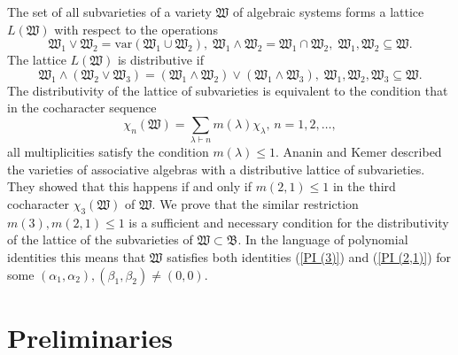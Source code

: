 \documentclass{amsart}
\theoremstyle{definition}
\begin{document}
The set of all subvarieties of a variety $\mathfrak W$ of algebraic systems forms a lattice $L({\mathfrak W})$ with respect to the operations
\[
{\mathfrak W}_1\vee{\mathfrak W}_2=\text{var}({\mathfrak W}_1\cup{\mathfrak W}_2),\;{\mathfrak W}_1\wedge{\mathfrak W}_2={\mathfrak W}_1\cap{\mathfrak W}_2,\;
{\mathfrak W}_1,{\mathfrak W}_2\subseteq {\mathfrak W}.
\]
The lattice $L({\mathfrak W})$ is distributive if
\[
{\mathfrak W}_1\wedge({\mathfrak W}_2\vee{\mathfrak W}_3)=({\mathfrak W}_1\wedge{\mathfrak W}_2)\vee({\mathfrak W}_1\wedge{\mathfrak W}_3),\;
{\mathfrak W}_1,{\mathfrak W}_2,{\mathfrak W}_3\subseteq{\mathfrak W}.
\]
The distributivity of the lattice of subvarieties is equivalent to the condition that in the cocharacter sequence
\[
\chi_n({\mathfrak W})=\sum_{\lambda\vdash n}m(\lambda)\chi_{\lambda},\,n=1,2,\ldots,
\]
all  multiplicities satisfy the condition $m(\lambda)\leq 1$.
Ananin and Kemer \cite{AK} described the varieties of associative algebras with a distributive lattice of subvarieties.
They showed that this happens if and only if  $m(2,1)\leq 1$ in the third cocharacter $\chi_3({\mathfrak W})$ of $\mathfrak W$.
We prove that the similar restriction $m(3),m(2,1)\leq 1$ is a sufficient and necessary condition for the distributivity of the lattice of the subvarieties
of ${\mathfrak W}\subset\mathfrak B$. In the language of polynomial identities this means that $\mathfrak W$ satisfies both identities
(\ref{PI (3)}) and (\ref{PI (2,1)}) for some $(\alpha_1,\alpha_2),(\beta_1,\beta_2)\not=(0,0)$.

\section{Preliminaries}
\end{document}
